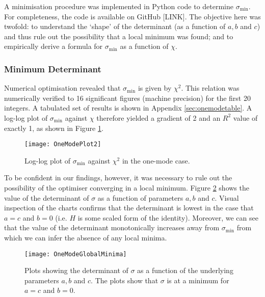 \documentclass[11pt,a4paper]{article}
\numberwithin{equation}{section}
\begin{document}
	A minimisation procedure was implemented in Python code to determine $\sigma_\text{min}$. For completeness, the code is available on GitHub [LINK]. The objective here was twofold: to understand the `shape' of the determinant (as a function of $a, b$ and $c$) and thus rule out the possibility that a local minimum was found; and to empirically derive a formula for $\sigma_\text{min}$ as a function of $\chi$.
	
	\subsubsection{Minimum Determinant}
	
	Numerical optimisation revealed that $\sigma_\text{min}$ is given by $\chi^{2}$. This relation was numerically verified to 16 significant figures (machine precision) for the first 20 integers. A tabulated set of results is shown in Appendix \ref{sec:onemodetable}. A log-log plot of $\sigma_\text{min}$ against $\chi$ therefore yielded a gradient of 2 and an $R^2$ value of exactly 1, as shown in Figure \ref{fig:OneModePlot}.
	
	\begin{figure}
		\centering
		\texttt{[image: OneModePlot2]}
		\caption[One mode case: log-log plot of $\sigma_\text{min}$ against $\chi^2$]{Log-log plot of $\sigma_\text{min}$ against $\chi^2$ in the one-mode case.}
		\label{fig:OneModePlot}
	\end{figure}
	
	To be confident in our findings, however, it was necessary to rule out the possibility of the optimiser converging in a local minimum. Figure \ref{fig:OneModeGlobalMinima} shows the value of the determinant of $\sigma$ as a function of parameters $a, b$ and $c$. Visual inspection of the charts confirms that the determinant is lowest in the case that $a=c$ and $b=0$ (i.e. $H$ is some scaled form of the identity). Moreover, we can see that the value of the determinant monotonically increases away from $\sigma_\text{min}$ from which we can infer the absence of any local minima. 
	
	\begin{figure}
		\centering
		\texttt{[image: OneModeGlobalMinima]}
		\caption[One mode determinant plots]{Plots showing the determinant of $\sigma$ as a function of the underlying parameters $a, b$ and $c$. The plots show that $\sigma$ is at a minimum for $a=c$ and $b=0$.}
		\label{fig:OneModeGlobalMinima}
	\end{figure}
	
\end{document}
